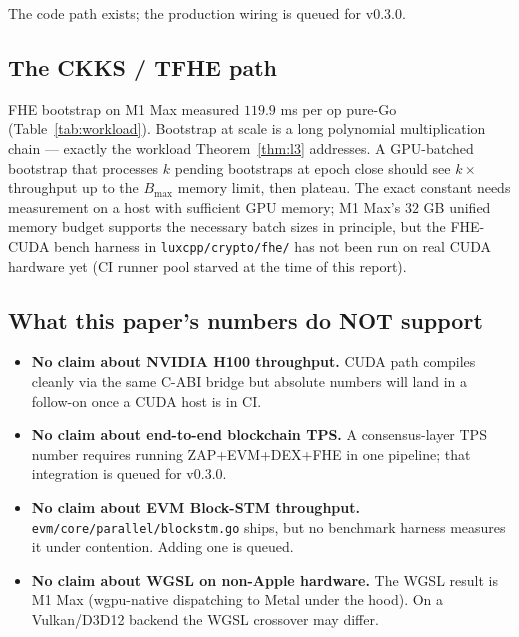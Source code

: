 The code path exists; the production wiring is queued for v0.3.0.

\subsection{The CKKS / TFHE path}

FHE bootstrap on M1 Max measured $119.9$ ms per op pure-Go
(Table~\ref{tab:workload}). Bootstrap at scale is a long polynomial
multiplication chain — exactly the workload Theorem~\ref{thm:l3}
addresses. A GPU-batched bootstrap that processes $k$ pending
bootstraps at epoch close should see $k \times$ throughput up to
the $B_\text{max}$ memory limit, then plateau. The exact constant
needs measurement on a host with sufficient GPU memory; M1 Max's
$32$ GB unified memory budget supports the necessary batch sizes
in principle, but the FHE-CUDA bench harness in
\texttt{luxcpp/crypto/fhe/} has not been run on real CUDA hardware
yet (CI runner pool starved at the time of this report).

\subsection{What this paper's numbers do NOT support}

\begin{itemize}[nosep,leftmargin=2em]
\item \textbf{No claim about NVIDIA H100 throughput.} CUDA path
compiles cleanly via the same C-ABI bridge but absolute numbers
will land in a follow-on once a CUDA host is in CI.
\item \textbf{No claim about end-to-end blockchain TPS.} A
consensus-layer TPS number requires running ZAP+EVM+DEX+FHE in one
pipeline; that integration is queued for v0.3.0.
\item \textbf{No claim about EVM Block-STM throughput.}
\texttt{evm/core/parallel/blockstm.go} ships, but no benchmark
harness measures it under contention. Adding one is queued.
\item \textbf{No claim about WGSL on non-Apple hardware.} The WGSL
result is M1 Max (wgpu-native dispatching to Metal under the hood).
On a Vulkan/D3D12 backend the WGSL crossover may differ.
\end{itemize}
